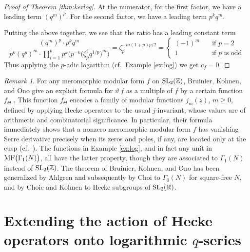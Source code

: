 \documentclass{gtpart}
\theoremstyle{definition}
\theoremstyle{remark}
\newtheorem{rmk}[thm]{Remark}
\newcommand{\mb}[1]{\mathbb{#1}}
\newcommand{\BR}{{\mb R}}
\newcommand{\BZ}{{\mb Z}}
\newcommand{\MF}{{\rm MF}}
\newcommand{\G}{\Gamma}
\renewcommand{\=}{\approx}
\renewcommand{\-}{\sim}
\newcommand{\SL}{{\rm SL}}
\numberwithin{equation}{section}
\numberwithin{thm}{section}
\begin{document}
\begin{proof}[Proof of Theorem \ref{thm:kerlog}]
 At the numerator, for the first factor, we have a leading term $(q^m)^p$.  
 For the second factor, we have a leading term $p^k q^m$.  

 Putting the above together, we see that the ratio has a leading constant term 
 \[
  \frac{(q^m)^p \cdot p^k q^m}{p^k (q^p)^m \cdot \prod_{i=1}^p p^k \Big( p^{-k} \big( \zeta_p^i q^{1/p} \big)^m \Big)} = \zeta_p^{-m (1 + p) p / 2} = \left\{\!\!
  \begin{array}{ll}
    (-1)^m & \quad \text{if $p = 2$} \\
    1 & \quad \text{if $p$ is odd} 
  \end{array}
  \right.
\]
Thus applying the $p$-adic logarithm (cf.~Example \ref{ex:log}) we get $c_f = 0$.  
\end{proof}

\begin{rmk}
 For any meromorphic modular form $f$ on $\SL_2(\BZ)$, 
 Bruinier, Kohnen, and Ono give an explicit formula for $\vartheta ~\! f$ as a multiple of $f$ by a certain function $f_\Theta$ \cite[Theorem 1]{BKO}.  
 This function $f_\Theta$ encodes a family of modular functions $j_m(z)$, $m \geq 0$, defined by applying Hecke operators to the usual $j$-invariant, 
 whose values are of arithmetic and combinatorial significance.  
 In particular, their formula immediately shows 
 that a nonzero meromorphic modular form $f$ has vanishing Serre derivative 
 precisely when its zeros and poles, if any, are located only at the cusp 
 (cf.~\cite[Proposition 6]{DumasRoyer}).  
 The functions in Example \ref{ex:log}, and in fact any unit in $\MF\big(\G_1(N)\big)$, all have the latter property, 
 though they are associated to $\G_1(N)$ instead of $\SL_2(\BZ)$.  
 The theorem of Bruinier, Kohnen, and Ono has been generalized by Ahlgren \cite[Theorem 2]{Ahlgren} 
 and subsequently by Choi \cite[Theorem 3.4]{Choi} to $\G_0(N)$ for square-free $N$, 
 and by Choie and Kohnen \cite{ChoieKohnen} to Hecke subgroups of $\SL_2(\BR)$.  
\end{rmk}



\section{Extending the action of Hecke operators onto logarithmic $q$-series}
\label{sec:logq}
\end{document}
